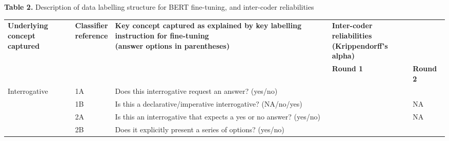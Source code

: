 \documentclass{article}
\newlength{\tabletotalwidth}
\begin{document}
\hspace*{0.5cm}\textbf{Table 2.} Description of data labelling structure for BERT fine-tuning, and inter-coder reliabilities

\vspace{0.5em}

\noindent\begin{minipage}{\tabletotalwidth}
\fontsize{10}{12}\selectfont %

\renewcommand{\arraystretch}{1.2}
\begin{tabular}{%
  p{2.8cm} p{1.3cm} p{7.1cm}
  >{\centering\arraybackslash}p{2.1cm}
  >{\centering\arraybackslash}p{2.1cm}}
\toprule
\parbox[t]{2.8cm}{\centering\textbf{Underlying concept}\\\textbf{captured}} &
\parbox[t]{1.3cm}{\centering\textbf{Classifier}\\\textbf{reference}} &
\parbox[t]{7.1cm}{\centering\textbf{Key concept captured as explained by key labelling instruction for fine-tuning}\\\textbf{(answer options in parentheses)}} &
%
{\parbox[t]{\dimexpr 2.1cm + 2.1cm + 2\tabcolsep\relax}{\centering\textbf{Inter-coder reliabilities}\\\textbf{(Krippendorff’s alpha)}}} \\
\cmidrule(lr){4-5}
 &  &  & \textbf{Round 1} & \textbf{Round 2} \\
\midrule
\parbox[t]{2.80cm}{Interrogative} & \parbox[t]{1.30cm}{1A} & \parbox[t]{7.10cm}{Does this interrogative request an answer? (yes/no)} & \parbox[t]{2.10cm}{} & \parbox[t]{2.10cm}{} \\
\addlinespace[0.7em]
\parbox[t]{2.80cm}{} & \parbox[t]{1.30cm}{1B} & \parbox[t]{7.10cm}{Is this a declarative/imperative interrogative? (NA/no/yes)} & \parbox[t]{2.10cm}{} & \parbox[t]{2.10cm}{\centering NA} \\
\addlinespace[0.7em]
\parbox[t]{2.80cm}{Selection-size-specification} & \parbox[t]{1.30cm}{2A} & \parbox[t]{7.10cm}{Is this an interrogative that expects a yes or no answer? (yes/no)} & \parbox[t]{2.10cm}{} & \parbox[t]{2.10cm}{\centering NA} \\
\addlinespace[0.7em]
\parbox[t]{2.80cm}{} & \parbox[t]{1.30cm}{2B} & \parbox[t]{7.10cm}{Does it explicitly present a series of options? (yes/no)} & \parbox[t]{2.10cm}{} & \parbox[t]{2.10cm}{} \\

\end{tabular}
\end{minipage}
\end{document}
